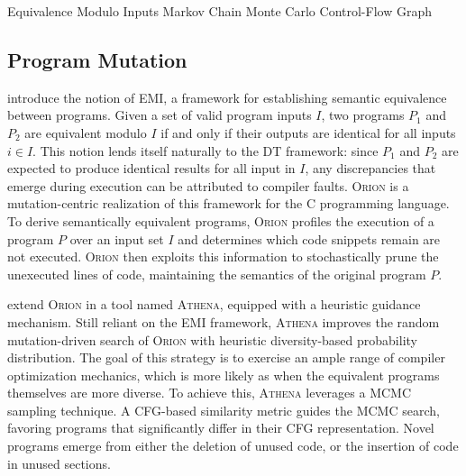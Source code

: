  {Equivalence Modulo Inputs}
 {Markov Chain Monte Carlo}
 {Control-Flow Graph}

\subsection{\label{subsec:pm}Program Mutation}

\citet{le2014compiler} introduce the notion of \Gls{EMI},
a framework for establishing semantic equivalence between
programs.
Given a set of valid program inputs $I$,
two programs $P_1$ and $P_2$ are equivalent modulo $I$
if and only if their outputs are identical for all inputs
$i \in I$.
This notion lends itself naturally to the \gls{DT} framework:
since $P_1$ and $P_2$ are expected to produce identical results
for all input in $I$, any discrepancies that emerge during execution
can be attributed to compiler faults.
\textsc{Orion} is a mutation-centric realization of this framework for 
the C programming language.
To derive semantically equivalent programs, \textsc{Orion} profiles the
execution of a program $P$ over an input set $I$ and determines
which code snippets remain are not executed.
\textsc{Orion} then exploits this information to stochastically
prune the unexecuted lines of code, maintaining the semantics of
the original program $P$.

\citet{le2015finding} extend \textsc{Orion} in a tool named \textsc{Athena},
equipped with a heuristic guidance mechanism.
Still reliant on the \gls{EMI} framework, \textsc{Athena} improves
the random mutation-driven search of \textsc{Orion} with heuristic
diversity-based probability distribution.
The goal of this strategy is to exercise an ample range of compiler
optimization mechanics, which is more likely as when the equivalent 
programs themselves are more diverse.
To achieve this, \textsc{Athena} leverages a \Gls{MCMC} sampling technique.
A \Gls{CFG}-based similarity metric guides the \gls{MCMC} search,
favoring programs that significantly differ in their \gls{CFG} representation.
Novel programs emerge from either the deletion of unused code, or the insertion
of code in unused sections.


